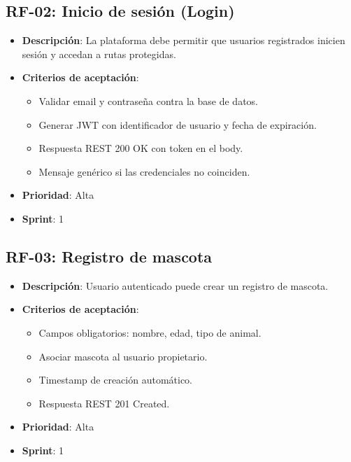 \documentclass[12pt,a4paper]{article}
\begin{document}
\subsection{RF-02: Inicio de sesi\'on (Login)}
\begin{itemize}[leftmargin=*]
    \item \textbf{Descripci\'on}: La plataforma debe permitir que usuarios registrados inicien sesi\'on y accedan a rutas protegidas.
    \item \textbf{Criterios de aceptaci\'on}:
    \begin{itemize}[leftmargin=*]
        \item Validar email y contrase\~na contra la base de datos.
        \item Generar JWT con identificador de usuario y fecha de expiraci\'on.
        \item Respuesta REST 200 OK con token en el body.
        \item Mensaje gen\'erico si las credenciales no coinciden.
    \end{itemize}
    \item \textbf{Prioridad}: Alta
    \item \textbf{Sprint}: 1
\end{itemize}

\subsection{RF-03: Registro de mascota}
\begin{itemize}[leftmargin=*]
    \item \textbf{Descripci\'on}: Usuario autenticado puede crear un registro de mascota.
    \item \textbf{Criterios de aceptaci\'on}:
    \begin{itemize}[leftmargin=*]
        \item Campos obligatorios: nombre, edad, tipo de animal.
        \item Asociar mascota al usuario propietario.
        \item Timestamp de creaci\'on autom\'atico.
        \item Respuesta REST 201 Created.
    \end{itemize}
    \item \textbf{Prioridad}: Alta
    \item \textbf{Sprint}: 1
\end{itemize}
\end{document}
